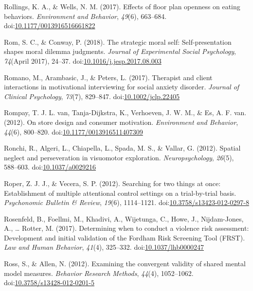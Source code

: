 \documentclass[english,man]{apa6}
\theoremstyle{definition}
\theoremstyle{definition}
\theoremstyle{definition}
\theoremstyle{remark}
\begin{document}
\hypertarget{ref-Rollings2017}{}
Rollings, K. A., \& Wells, N. M. (2017). Effects of floor plan openness
on eating behaviors. \emph{Environment and Behavior}, \emph{49}(6),
663--684.
doi:\href{https://doi.org/10.1177/0013916516661822}{10.1177/0013916516661822}

\hypertarget{ref-Rom2018}{}
Rom, S. C., \& Conway, P. (2018). The strategic moral self:
Self-presentation shapes moral dilemma judgments. \emph{Journal of
Experimental Social Psychology}, \emph{74}(April 2017), 24--37.
doi:\href{https://doi.org/10.1016/j.jesp.2017.08.003}{10.1016/j.jesp.2017.08.003}

\hypertarget{ref-Romano2017}{}
Romano, M., Arambasic, J., \& Peters, L. (2017). Therapist and client
interactions in motivational interviewing for social anxiety disorder.
\emph{Journal of Clinical Psychology}, \emph{73}(7), 829--847.
doi:\href{https://doi.org/10.1002/jclp.22405}{10.1002/jclp.22405}

\hypertarget{ref-VanRompay2012}{}
Rompay, T. J. L. van, Tanja-Dijkstra, K., Verhoeven, J. W. M., \& Es, A.
F. van. (2012). On store design and consumer motivation.
\emph{Environment and Behavior}, \emph{44}(6), 800--820.
doi:\href{https://doi.org/10.1177/0013916511407309}{10.1177/0013916511407309}

\hypertarget{ref-Ronchi2012}{}
Ronchi, R., Algeri, L., Chiapella, L., Spada, M. S., \& Vallar, G.
(2012). Spatial neglect and perseveration in visuomotor exploration.
\emph{Neuropsychology}, \emph{26}(5), 588--603.
doi:\href{https://doi.org/10.1037/a0029216}{10.1037/a0029216}

\hypertarget{ref-Roper2012}{}
Roper, Z. J. J., \& Vecera, S. P. (2012). Searching for two things at
once: Establishment of multiple attentional control settings on a
trial-by-trial basis. \emph{Psychonomic Bulletin \& Review},
\emph{19}(6), 1114--1121.
doi:\href{https://doi.org/10.3758/s13423-012-0297-8}{10.3758/s13423-012-0297-8}

\hypertarget{ref-Rosenfeld2017}{}
Rosenfeld, B., Foellmi, M., Khadivi, A., Wijetunga, C., Howe, J.,
Nijdam-Jones, A., \ldots{} Rotter, M. (2017). Determining when to
conduct a violence risk assessment: Development and initial validation
of the Fordham Risk Screening Tool (FRST). \emph{Law and Human
Behavior}, \emph{41}(4), 325--332.
doi:\href{https://doi.org/10.1037/lhb0000247}{10.1037/lhb0000247}

\hypertarget{ref-Ross2012}{}
Ross, S., \& Allen, N. (2012). Examining the convergent validity of
shared mental model measures. \emph{Behavior Research Methods},
\emph{44}(4), 1052--1062.
doi:\href{https://doi.org/10.3758/s13428-012-0201-5}{10.3758/s13428-012-0201-5}
\end{document}
